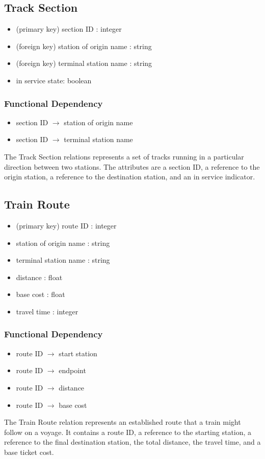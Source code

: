 \documentclass[a4paper]{article}
\begin{document}
\subsection*{Track Section}
\begin{itemize}
\item (primary key) section ID : integer
\item (foreign key) station of origin name : string
\item (foreign key) terminal station name : string
\item in service state: boolean
\end{itemize}
\subsubsection*{Functional Dependency}
\begin{itemize}
\item section ID $\rightarrow$ station of origin name 
\item section ID $\rightarrow$ terminal station name
\end{itemize}
The Track Section relations represents a set of tracks running in a particular direction between two stations. The attributes are a section ID, a reference to the origin station, a reference to the destination station, and an in service indicator.

\subsection*{Train Route}
\begin{itemize}
\item (primary key) route ID : integer
\item station of origin name : string
\item terminal station name : string
\item distance : float
\item base cost : float
\item travel time : integer 
\end{itemize}
\subsubsection*{Functional Dependency}
\begin{itemize}
\item route ID $\rightarrow$ start station
\item route ID $\rightarrow$ endpoint
\item route ID $\rightarrow$ distance
\item route ID $\rightarrow$ base cost
\end{itemize}
The Train Route relation represents an established route that a train might follow on a voyage. It contains a route ID, a reference to the starting station, a reference to the final destination station, the total distance, the travel time, and a base ticket cost.
\end{document}
